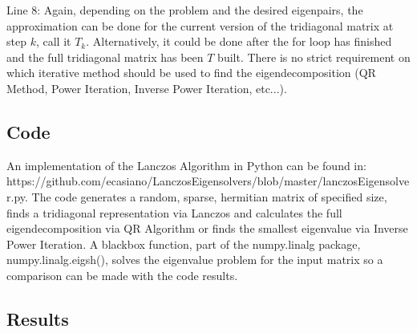 Line $8$: Again, depending on the problem and the desired eigenpairs, the approximation can be done for the current version of the tridiagonal matrix at step $k$, call it $T_k$. Alternatively, it could be done after the for loop has finished and the full tridiagonal matrix has been $T$ built. There is no strict requirement on which iterative method should be used to find the eigendecomposition (QR Method, Power Iteration, Inverse Power Iteration, etc...). 

\subsection{Code}

An implementation of the Lanczos Algorithm in Python can be found in: https://github.com/ecasiano/LanczosEigensolvers/blob/master/lanczosEigensolver.py. The code generates a random, sparse, hermitian matrix of specified size, finds a tridiagonal representation via Lanczos and calculates the full eigendecomposition via QR Algorithm or finds the smallest eigenvalue via Inverse Power Iteration. A blackbox function, part of the numpy.linalg package, numpy.linalg.eigsh(), solves the eigenvalue problem for the input matrix so a comparison can be made with the code results.

\subsection{Results}

